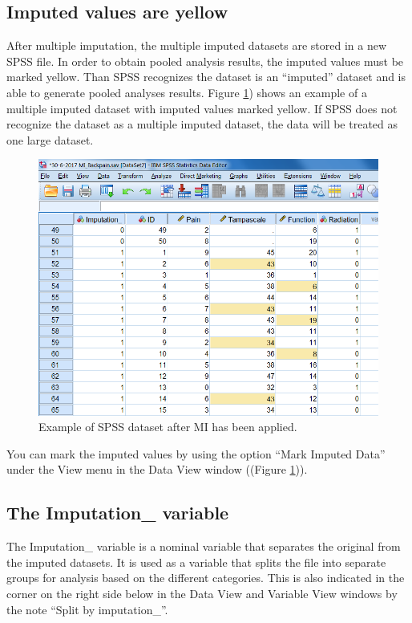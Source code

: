 \documentclass[]{book}
\begin{document}
\subsection{Imputed values are yellow}\label{imputed-values-are-yellow}

After multiple imputation, the multiple imputed datasets are stored in a
new SPSS file. In order to obtain pooled analysis results, the imputed
values must be marked yellow. Than SPSS recognizes the dataset is an
``imputed'' dataset and is able to generate pooled analyses results.
Figure \ref{fig:fig5-1}) shows an example of a multiple imputed dataset
with imputed values marked yellow. If SPSS does not recognize the
dataset as a multiple imputed dataset, the data will be treated as one
large dataset.

\begin{figure}

{\centering \includegraphics[width=0.9\linewidth]{images/fig5.1} 

}

\caption{Example of SPSS dataset after MI has been applied.}\label{fig:fig5-1}
\end{figure}

You can mark the imputed values by using the option ``Mark Imputed
Data'' under the View menu in the Data View window ((Figure
\ref{fig:fig5-1})).

\subsection{The Imputation\_ variable}\label{the-imputation_-variable}

The Imputation\_ variable is a nominal variable that separates the
original from the imputed datasets. It is used as a variable that splits
the file into separate groups for analysis based on the different
categories. This is also indicated in the corner on the right side below
in the Data View and Variable View windows by the note ``Split by
imputation\_''.
\end{document}
